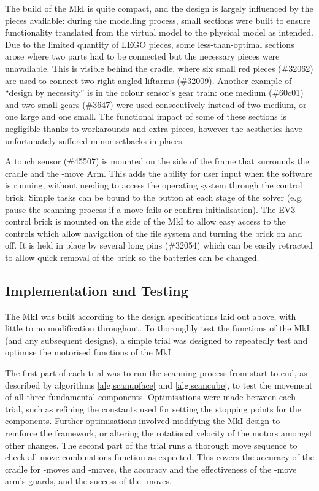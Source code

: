 \documentclass{report}
\newcommand{\legopiece}[1]{(\##1)}
\newcommand{\move}[1]{\uppercase{\texttt{\formatmovesnospace{#1}}}-move}
\newcommand{\lego}{LEGO }
\begin{document}
	The build of the MkI is quite compact, and the design is largely influenced by the pieces available: during the modelling process, small sections were built to ensure functionality translated from the virtual model to the physical model as intended. Due to the limited quantity of \lego pieces, some less-than-optimal sections arose where two parts had to be connected but the necessary pieces were unavailable. This is visible behind the cradle, where six small red pieces \legopiece{32062} are used to connect two right-angled liftarms \legopiece{32009}. Another example of \enquote{design by necessity} is in the colour sensor's gear train: one medium \legopiece{60c01} and two small gears \legopiece{3647} were used consecutively instead of two medium, or one large and one small. The functional impact of some of these sections is negligible thanks to workarounds and extra pieces, however the aesthetics have unfortunately suffered minor setbacks in places.
	
	A touch sensor \legopiece{45507} is mounted on the side of the frame that surrounds the cradle and the \move{x} Arm. This adds the ability for user input when the software is running, without needing to access the operating system through the control brick. Simple tasks can be bound to the button at each stage of the solver (e.g. pause the scanning process if a move fails or confirm initialisation). The EV3 control brick is mounted on the side of the MkI to allow easy access to the controls which allow navigation of the file system and turning the brick on and off. It is held in place by several long pins \legopiece{32054} which can be easily retracted to allow quick removal of the brick so the batteries can be changed.

	\subsection{Implementation and Testing}
	
	The MkI was built according to the design specifications laid out above, with little to no modification throughout. To thoroughly test the functions of the MkI (and any subsequent designs), a simple trial was designed to repeatedly test and optimise the motorised functions of the MkI.
	
	The first part of each trial was to run the scanning process from start to end, as described by algorithms \ref{alg:scanupface} and \ref{alg:scancube}, to test the movement of all three fundamental components. Optimisations were made between each trial, such as refining the constants used for setting the stopping points for the components. Further optimisations involved modifying the MkI design to reinforce the framework, or altering the rotational velocity of the motors amongst other changes. The second part of the trial runs a thorough move sequence to check all move combinations function as expected. This covers the accuracy of the cradle for \move{d}s and \move{y}s, the accuracy and the effectiveness of the \move{x} arm's guards, and the success of the \move{x}s.
	
\end{document}
